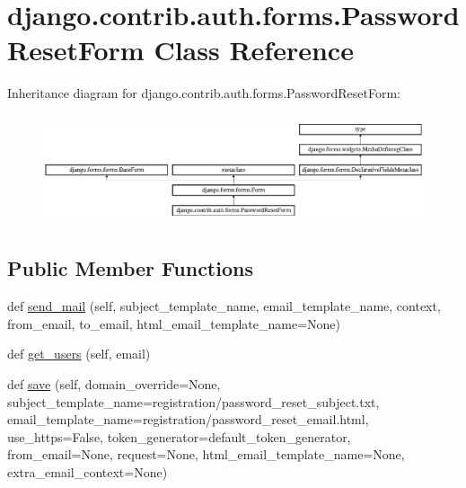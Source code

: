 \hypertarget{classdjango_1_1contrib_1_1auth_1_1forms_1_1_password_reset_form}{}\section{django.\+contrib.\+auth.\+forms.\+Password\+Reset\+Form Class Reference}
\label{classdjango_1_1contrib_1_1auth_1_1forms_1_1_password_reset_form}
Inheritance diagram for django.\+contrib.\+auth.\+forms.\+Password\+Reset\+Form\+:\begin{figure}[H]
\begin{center}
\leavevmode
\includegraphics[height=3.240741cm]{classdjango_1_1contrib_1_1auth_1_1forms_1_1_password_reset_form}
\end{center}
\end{figure}
\subsection*{Public Member Functions}
\begin{DoxyCompactItemize}
\item 
def \mbox{\hyperlink{classdjango_1_1contrib_1_1auth_1_1forms_1_1_password_reset_form_ae171285c9a365d3a40aed8c7fab6d8c7}{send\+\_\+mail}} (self, subject\+\_\+template\+\_\+name, email\+\_\+template\+\_\+name, context, from\+\_\+email, to\+\_\+email, html\+\_\+email\+\_\+template\+\_\+name=None)
\item 
def \mbox{\hyperlink{classdjango_1_1contrib_1_1auth_1_1forms_1_1_password_reset_form_a5901cf6c13e1a8b3ca34e1882c560eb0}{get\+\_\+users}} (self, email)
\item 
def \mbox{\hyperlink{classdjango_1_1contrib_1_1auth_1_1forms_1_1_password_reset_form_aa62f74e3dfa401f014669aaecf74c396}{save}} (self, domain\+\_\+override=None, subject\+\_\+template\+\_\+name=\textquotesingle{}registration/password\+\_\+reset\+\_\+subject.\+txt\textquotesingle{}, email\+\_\+template\+\_\+name=\textquotesingle{}registration/password\+\_\+reset\+\_\+email.\+html\textquotesingle{}, use\+\_\+https=False, token\+\_\+generator=default\+\_\+token\+\_\+generator, from\+\_\+email=None, request=None, html\+\_\+email\+\_\+template\+\_\+name=None, extra\+\_\+email\+\_\+context=None)
\end{DoxyCompactItemize}
